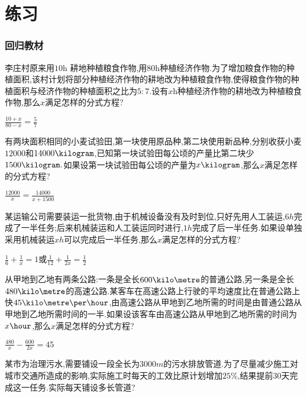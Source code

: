 \documentclass[cn,blue,12pt]{elegantbook}
\begin{document}
\section{练习}%
\label{sec:练习}

\subsubsection{回归教材}%
\begin{shiti}
\item 李庄村原来用\( 10\)h \squaremetre 耕地种植粮食作物,用\( 80\)h\squaremetre 种植经济作物.为了增加粮食作物的种植面积,该村计划将部分种植经济作物的耕地改为种植粮食作物,使得粮食作物的种植面积与经济作物的种植面积之比为\( 5:7. \)设有\( x \)h\squaremetre 种植经济作物的耕地改为种植粮食作物,那么\( x \)满足怎样的分式方程?
\begin{solution}
        \(\frac{10+x}{80-x}=\frac{5}{7}\)
\end{solution}
\item 有两块面积相同的小麦试验田,第一块使用原品种,第二块使用新品种,分别收获小麦\( 12 000 \)\kilogram 和\( 14 000 \kilogram \),已知第一块试验田每公顷的产量比第二块少\( 1 500 \kilogram. \)如果设第一块试验田每公顷的产量为\( x \kilogram \),那么\( x \)满足怎样的分式方程?
\begin{solution}
\(\frac{12000}{x}=\frac{14000}{x+1500}\)
\end{solution}
\item 某运输公司需要装运一批货物,由于机械设备没有及时到位,只好先用人工装运,\( 6 h\)完成了一半任务;后来机械装运和人工装运同时进行,\( 1 h \)完成了后一半任务.如果设单独采用机械装运\( x h \)可以完成后一半任务,那么\( x \)满足怎样的分式方程?
\begin{solution}
        \(\frac{1}{6}+\frac{1}{x}=1\)或\(\frac{1}{12}+\frac{1}{2x}=\frac{1}{2}\)
\end{solution}
\item 从甲地到乙地有两条公路:一条是全长\( 600 \kilo\metre \)的普通公路,另一条是全长\( 480 \kilo\metre  \)的高速公路.某客车在高速公路上行驶的平均速度比在普通公路上快\( 45 \kilo\metre\per\hour\),由高速公路从甲地到乙地所需的时间是由普通公路从甲地到乙地所需时间的一半.如果设该客车由高速公路从甲地到乙地所需的时间为\( x \hour\),那么\( x \)满足怎样的分式方程?
\begin{solution}
        \(\frac{480}{x}-\frac{600}{2x}=45\)
\end{solution}
\item 某市为治理污水,需要铺设一段全长为\( 3 000 m \)的污水排放管道.为了尽量减少施工对城市交通所造成的影响,实际施工时每天的工效比原计划增加\( 25\%\),结果提前\( 30 \)天完成这一任务.实际每天铺设多长管道?

\end{shiti}
\end{document}

